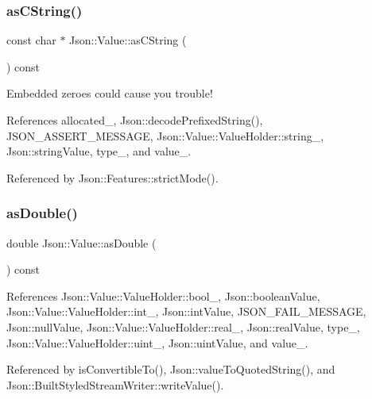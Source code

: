\subsubsection{\texorpdfstring{as\+C\+String()}{asCString()}}
{\footnotesize\ttfamily const char $\ast$ Json\+::\+Value\+::as\+C\+String (\begin{DoxyParamCaption}{ }\end{DoxyParamCaption}) const}



Embedded zeroes could cause you trouble! 



References allocated\+\_\+, Json\+::decode\+Prefixed\+String(), J\+S\+O\+N\+\_\+\+A\+S\+S\+E\+R\+T\+\_\+\+M\+E\+S\+S\+A\+GE, Json\+::\+Value\+::\+Value\+Holder\+::string\+\_\+, Json\+::string\+Value, type\+\_\+, and value\+\_\+.



Referenced by Json\+::\+Features\+::strict\+Mode().

\mbox{\label{classJson_1_1Value_afd24002a18aef907ad746b1cb9eda0a2_afd24002a18aef907ad746b1cb9eda0a2}} 
\subsubsection{\texorpdfstring{as\+Double()}{asDouble()}}
{\footnotesize\ttfamily double Json\+::\+Value\+::as\+Double (\begin{DoxyParamCaption}{ }\end{DoxyParamCaption}) const}



References Json\+::\+Value\+::\+Value\+Holder\+::bool\+\_\+, Json\+::boolean\+Value, Json\+::\+Value\+::\+Value\+Holder\+::int\+\_\+, Json\+::int\+Value, J\+S\+O\+N\+\_\+\+F\+A\+I\+L\+\_\+\+M\+E\+S\+S\+A\+GE, Json\+::null\+Value, Json\+::\+Value\+::\+Value\+Holder\+::real\+\_\+, Json\+::real\+Value, type\+\_\+, Json\+::\+Value\+::\+Value\+Holder\+::uint\+\_\+, Json\+::uint\+Value, and value\+\_\+.



Referenced by is\+Convertible\+To(), Json\+::value\+To\+Quoted\+String(), and Json\+::\+Built\+Styled\+Stream\+Writer\+::write\+Value().

\mbox{\label{classJson_1_1Value_af3a4d10bf575fabdc5440a7135c9649c_af3a4d10bf575fabdc5440a7135c9649c}} 
